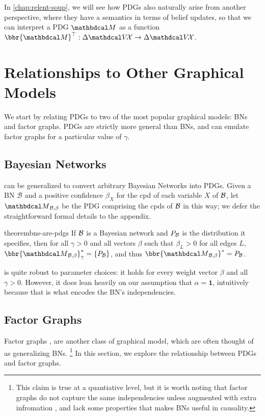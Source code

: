 In \cref{chap:relent-soup}, we will see how PDGs also naturally arise from another perspective, where they have a semantics in terms of belief updates, so that we can interpret a PDG $\dg M$ as a function 
$\bbr{\dg M}^\top : \Delta \V\!\X \to \Delta \V\!\X$.

\section{Relationships to Other Graphical Models}
\label{sec:other-graphical-models} 
We start by relating
PDGs to two of the most popular graphical models: BNs and factor
graphs. PDGs are strictly more general than BNs, and can emulate factor graphs
for a particular value of $\gamma$. 
\subsection{Bayesian Networks} 
\label{sec:bn-convert}

 can be generalized to convert arbitrary Bayesian Networks into PDGs.
Given a BN $\mathcal B$ and a positive confidence $\beta_X$ for
the cpd of each variable $X$ of $\cal B$,
let $\PDGof{\mathcal B, \beta}$
be the PDG comprising the cpds of $\cal B$
in this way; we defer the straightforward formal details to the appendix. 

	
\begin{linked}{theorem}{bns-are-pdgs}
 	  If $\cal B$ is a Bayesian network
          and $\Pr_{\cal B}$ is the distribution it specifies, then
        for all $\gamma > 0$ and all vectors $\beta$ such
        that $\beta_L > 0$ for all edges $L$,
        $\bbr{\PDGof{\mathcal B, \beta}}_\gamma^* = \{ \Pr_{\cal B}\}$, 
and thus $\bbr{\PDGof{\mathcal B, \beta}}^* = \Pr_{\cal B}$.    
\end{linked}
 is quite robust to parameter choices: it holds for every
weight vector $\beta$ and all $\gamma > 0$.
However, it does lean heavily on our assumption that $\alpha = \mathbf 1$, intuitively because that is what encodes the BN's independencies. 



\subsection{Factor Graphs} 
    \label{sec:factor-graphs}
Factor graphs 
\cite{kschischang2001sumproduct},
are another class of graphical model, which are often thought of as generalizing BNs.%
    \footnote{This claim is true at a quantiative level, but it is worth noting that factor graphs do not capture the same independencies unless augmented with extra infromation \cite{frey2012extending}, and lack some properties that makes BNs useful in causality.}
In this section, we explore the relationship between PDGs and factor graphs.

